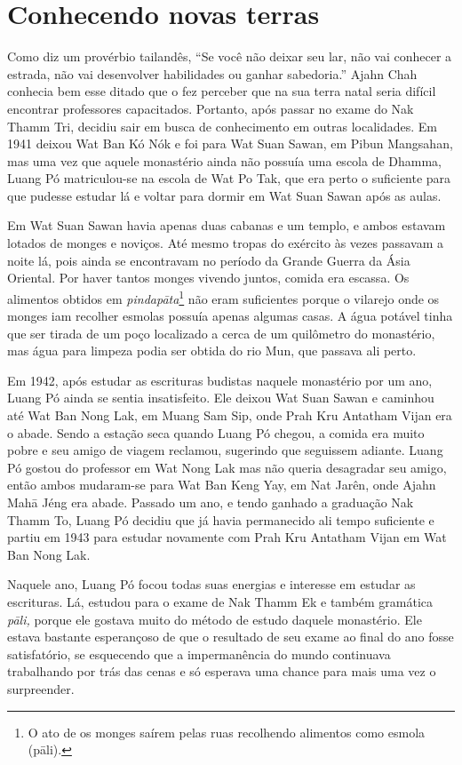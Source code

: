 \chapter{Conhecendo novas terras}

Como diz um provérbio tailandês, ``Se você não deixar seu lar, não vai
conhecer a estrada, não vai desenvolver habilidades ou ganhar
sabedoria.'' Ajahn Chah conhecia bem esse ditado que o fez perceber que
na sua terra natal seria difícil encontrar professores capacitados.
Portanto, após passar no exame do Nak Thamm Tri, decidiu sair em busca
de conhecimento em outras localidades. Em 1941 deixou Wat Ban Kó Nók e
foi para Wat Suan Sawan, em Pibun Mangsahan, mas uma vez que aquele
monastério ainda não possuía uma escola de Dhamma, Luang Pó
matriculou-se na escola de Wat Po Tak, que era perto o suficiente para
que pudesse estudar lá e voltar para dormir em Wat Suan Sawan após as
aulas.

Em Wat Suan Sawan havia apenas duas cabanas e um templo, e ambos estavam
lotados de monges e noviços. Até mesmo tropas do exército às vezes
passavam a noite lá, pois ainda se encontravam no período da Grande
Guerra da Ásia Oriental. Por haver tantos monges vivendo juntos, comida
era escassa. Os alimentos obtidos em \emph{pindapāta}\footnote{O ato de
  os monges saírem pelas ruas recolhendo alimentos como esmola (pāli).}
não eram suficientes porque o vilarejo onde os monges iam recolher
esmolas possuía apenas algumas casas. A água potável tinha que ser
tirada de um poço localizado a cerca de um quilômetro do monastério, mas
água para limpeza podia ser obtida do rio Mun, que passava ali perto.

Em 1942, após estudar as escrituras budistas naquele monastério por um
ano, Luang Pó ainda se sentia insatisfeito. Ele deixou Wat Suan Sawan e
caminhou até Wat Ban Nong Lak, em Muang Sam Sip, onde Prah Kru Antatham
Vijan era o abade. Sendo a estação seca quando Luang Pó chegou, a comida
era muito pobre e seu amigo de viagem reclamou, sugerindo que seguissem
adiante. Luang Pó gostou do professor em Wat Nong Lak mas não queria
desagradar seu amigo, então ambos mudaram-se para Wat Ban Keng Yay, em
Nat Jarên, onde Ajahn Mahā Jéng era abade. Passado um ano, e tendo
ganhado a graduação Nak Thamm To, Luang Pó decidiu que já havia
permanecido ali tempo suficiente e partiu em 1943 para estudar novamente
com Prah Kru Antatham Vijan em Wat Ban Nong Lak.

Naquele ano, Luang Pó focou todas suas energias e interesse em estudar
as escrituras. Lá, estudou para o exame de Nak Thamm Ek e também
gramática \emph{pāli,} porque ele gostava muito do método de estudo
daquele monastério. Ele estava bastante esperançoso de que o resultado
de seu exame ao final do ano fosse satisfatório, se esquecendo que a
impermanência do mundo continuava trabalhando por trás das cenas e só
esperava uma chance para mais uma vez o surpreender.

